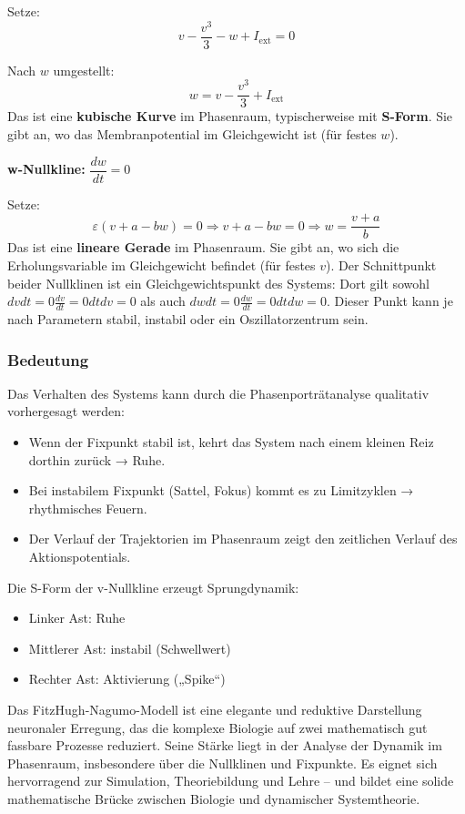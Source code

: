 \begin{refsection}
Setze:
\[
v - \frac{v^3}{3} - w + I_{\text{ext}} = 0
\]

Nach $w$ umgestellt:
\[
w = v - \frac{v^3}{3} + I_{\text{ext}}
\]
\noindent
Das ist eine \textbf{kubische Kurve} im Phasenraum, typischerweise mit \textbf{S-Form}.  
Sie gibt an, wo das Membranpotential im Gleichgewicht ist (für festes $w$).

\vspace{1em}

\textbf{w-Nullkline:} $\dfrac{dw}{dt} = 0$

Setze:
\[
\varepsilon (v + a - b w) = 0 \Rightarrow v + a - b w = 0 \Rightarrow w = \frac{v + a}{b}
\]
\noindent
Das ist eine \textbf{lineare Gerade} im Phasenraum.  
Sie gibt an, wo sich die Erholungsvariable im Gleichgewicht befindet (für festes $v$).
Der Schnittpunkt beider Nullklinen ist ein Gleichgewichtspunkt des Systems: Dort gilt sowohl $dvdt=0\frac{dv}{dt} = 0dtdv=0$ als auch $dwdt=0\frac{dw}{dt} = 0dtdw=0$. Dieser Punkt kann je nach Parametern stabil, instabil oder ein Oszillatorzentrum sein.
\subsubsection{Bedeutung}
Das Verhalten des Systems kann durch die Phasenporträtanalyse qualitativ vorhergesagt werden:
\begin{itemize}
    \item Wenn der Fixpunkt stabil ist, kehrt das System nach einem kleinen Reiz dorthin zurück → Ruhe.
    \item Bei instabilem Fixpunkt (Sattel, Fokus) kommt es zu Limitzyklen → rhythmisches Feuern.
    \item Der Verlauf der Trajektorien im Phasenraum zeigt den zeitlichen Verlauf des Aktionspotentials.
\end{itemize}
Die S-Form der v-Nullkline erzeugt Sprungdynamik:
\begin{itemize}
    \item Linker Ast: Ruhe
    \item Mittlerer Ast: instabil (Schwellwert)
    \item Rechter Ast: Aktivierung („Spike“)
\end{itemize}
\noindent
Das FitzHugh-Nagumo-Modell ist eine elegante und reduktive Darstellung neuronaler Erregung, das die komplexe Biologie
auf zwei mathematisch gut fassbare Prozesse reduziert. 
Seine Stärke liegt in der Analyse der Dynamik im Phasenraum, insbesondere über die Nullklinen und Fixpunkte. 
Es eignet sich hervorragend zur Simulation, Theoriebildung und Lehre – und bildet eine solide mathematische Brücke zwischen Biologie und dynamischer Systemtheorie.



\end{refsection}
